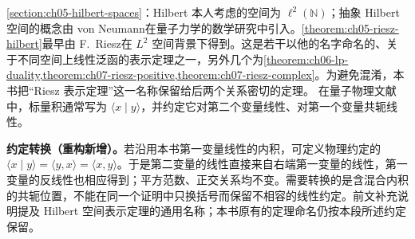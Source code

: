 \documentclass[../../main.tex]{subfiles}
\begin{document}
\cref{section:ch05-hilbert-spaces}：Hilbert 本人考虑的空间为 $\ell^2(\mathbb N)$；抽象 Hilbert 空间的概念由 von Neumann\cite{folland-bib-154}在量子力学的数学研究中引入。\cref{theorem:ch05-riesz-hilbert}最早由 F.~Riesz\cite{folland-bib-115}在 $L^2$ 空间背景下得到。这是若干以他的名字命名的、关于不同空间上线性泛函的表示定理之一，另外几个为\cref{theorem:ch06-lp-duality,theorem:ch07-riesz-positive,theorem:ch07-riesz-complex}。为避免混淆，本书把“Riesz 表示定理”这一名称保留给后两个关系密切的定理。
在量子物理文献中，标量积通常写为 $\langle x\mid y\rangle$，并约定它对第二个变量线性、对第一个变量共轭线性。
\begin{remark}
\textbf{约定转换（重构新增）。}若沿用本书第一变量线性的内积，可定义物理约定的 $\langle x\mid y\rangle=\langle y,x\rangle=\overline{\langle x,y\rangle}$。于是第二变量的线性直接来自右端第一变量的线性，第一变量的反线性也相应得到；平方范数、正交关系均不变。需要转换的是含混合内积的共轭位置，不能在同一个证明中只换括号而保留不相容的线性约定。前文补充说明提及 Hilbert 空间表示定理的通用名称；本书原有的定理命名仍按本段所述约定保留。
\end{remark}
\end{document}
